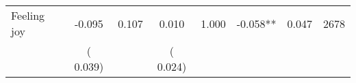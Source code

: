 \begin{tabular}{l*{7}{c}}
 Feeling joy       &             -0.095       &        0.107  &              0.010       &        1.000  &             -0.058**       &              0.047 &  2678 \\ 
                       &       (       0.039)             &                               &       (       0.024)                     &                               &                                               &                                &                      \\ 

\hline \end{tabular}